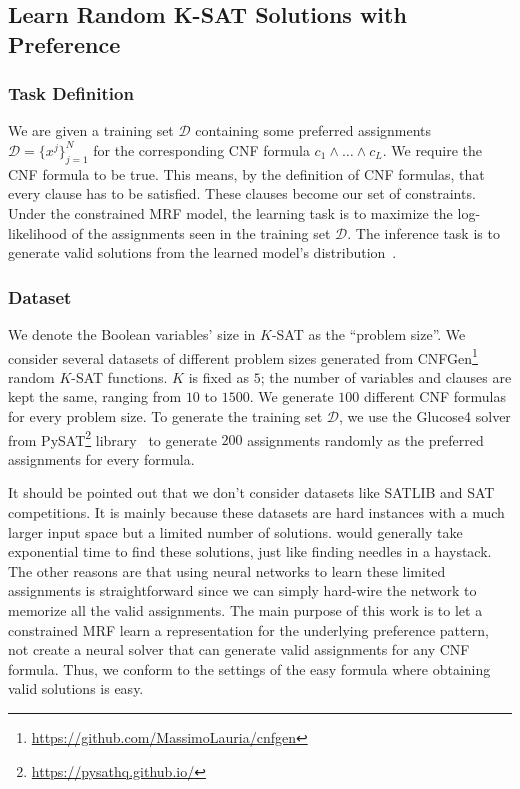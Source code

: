 \subsection{Learn Random K-SAT Solutions with Preference}
\subsubsection{Task Definition}  We are given a training set $\mathcal{D}$ containing some preferred assignments $\mathcal{D}=\{x^j\}_{j=1}^N$ for the corresponding CNF formula $c_1\wedge\ldots\wedge  c_L$. We require the CNF formula to be true. This means, by the definition of CNF formulas, that every clause has to be satisfied. These clauses become our set of constraints. Under the constrained MRF model, the learning task is to maximize the log-likelihood of the assignments seen in the training set $\mathcal{D}$. The inference task is to generate valid solutions from  the learned model's distribution~\cite{DBLP:conf/aiia/DodaroP19,DBLP:conf/sac/RosaGO11}.




\subsubsection{Dataset} We denote the Boolean variables' size in $K$-SAT as the ``problem size''. We consider several datasets of different problem sizes generated from CNFGen\footnote{\url{https://github.com/MassimoLauria/cnfgen}}~\cite{DBLP:conf/sat/LauriaENV17} random $K$-SAT functions. $K$ is fixed as $5$; the number of variables and clauses are kept the same,  ranging from $10$ to $1500$. We generate $100$ different CNF formulas  for every problem size. To generate the training set $\mathcal{D}$, we use the Glucose4 solver from PySAT\footnote{\url{https://pysathq.github.io/}} library~\cite{DBLP:conf/sat/IgnatievMM18} to generate $200$ assignments randomly as the preferred assignments for every formula. 

It should be pointed out that we don't consider datasets like SATLIB and SAT competitions. It is mainly because these datasets are hard instances with a much larger input space but a limited number of solutions. \nls would generally take exponential time to find these solutions, just like finding needles in a haystack. The other reasons are that using neural networks to learn these limited assignments is straightforward since we can simply hard-wire the network to memorize all the valid assignments. The main purpose of this work is to let a constrained MRF learn a representation for the underlying preference pattern, not create a neural solver that can generate valid assignments for any CNF formula. Thus, we conform to the settings of the easy formula where obtaining valid solutions is easy.









